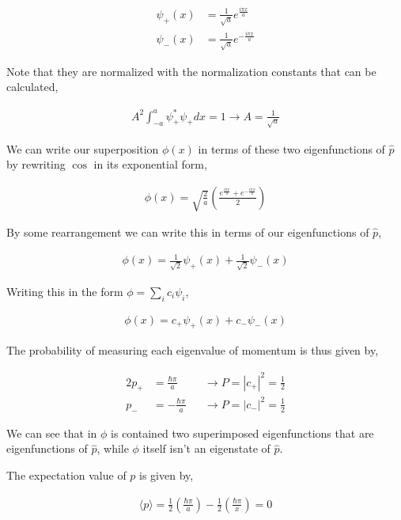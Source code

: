 \documentclass[11pt]{amsart}
\begin{document}
\begin{align*}
  \psi_+(x) &= \frac{1}{\sqrt{a}} e^{\frac{i\pi x}{a}} \\
  \psi_-(x) &= \frac{1}{\sqrt{a}} e^{-\frac{i\pi x}{a}}
\end{align*}

Note that they are normalized with the normalization constants that can be calculated,

\begin{align*}
  A^2 \int_{-a}^{a} \psi_+^* \psi_+ dx = 1 \to A = \frac{1}{\sqrt{a}}
\end{align*}

We can write our superposition $\phi(x)$ in terms of these two eigenfunctions of $\hat{p}$ by rewriting $\cos$ in its exponential form,

\begin{align*}
  \phi(x) = \sqrt{\frac{2}{a}} \left(\frac{e^{\frac{i\pi x}{a}} + e^{-\frac{i\pi x}{a}}}{2}\right)
\end{align*}

By some rearrangement we can write this in terms of our eigenfunctions of $\hat{p}$,

\begin{align*}
  \phi(x) = \frac{1}{\sqrt{2}} \psi_+(x) + \frac{1}{\sqrt{2}} \psi_-(x)
\end{align*}

Writing this in the form $\phi = \sum\limits_i c_i \psi_i$,

\begin{align*}
  \phi(x) = c_+ \psi_+(x) + c_- \psi_-(x)
\end{align*}

The probability of measuring each eigenvalue of momentum is thus given by,

\begin{alignat*}{2}
  p_+ &= \frac{\hbar\pi}{a}  &&\to P = {|c_+|}^2 = \frac{1}{2} \\
  p_- &= -\frac{\hbar\pi}{a} &&\to P = {|c_-|}^2 = \frac{1}{2}
\end{alignat*}

We can see that in $\phi$ is contained two superimposed eigenfunctions that are eigenfunctions of $\hat{p}$, while $\phi$ itself isn't an eigenstate of $\hat{p}$.

The expectation value of $p$ is given by,

\begin{align*}
  \langle p \rangle = \frac{1}{2}\left(\frac{\hbar\pi}{a}\right) - \frac{1}{2}\left(\frac{\hbar\pi}{x}\right) = 0
\end{align*}
\end{document}
